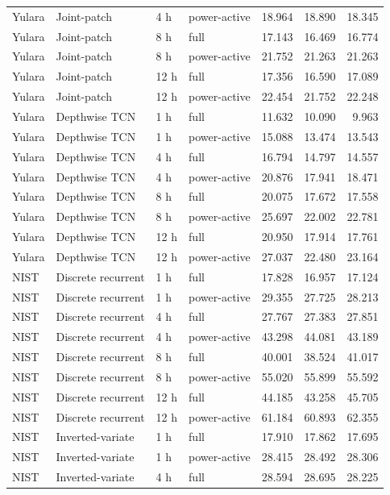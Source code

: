 \begin{longtable}{llllrrr}
Yulara & Joint-patch & 4 h & power-active & 18.964 & 18.890 & 18.345\\
Yulara & Joint-patch & 8 h & full & 17.143 & 16.469 & 16.774\\
Yulara & Joint-patch & 8 h & power-active & 21.752 & 21.263 & 21.263\\
Yulara & Joint-patch & 12 h & full & 17.356 & 16.590 & 17.089\\
Yulara & Joint-patch & 12 h & power-active & 22.454 & 21.752 & 22.248\\
Yulara & Depthwise TCN & 1 h & full & 11.632 & 10.090 & 9.963\\
Yulara & Depthwise TCN & 1 h & power-active & 15.088 & 13.474 & 13.543\\
Yulara & Depthwise TCN & 4 h & full & 16.794 & 14.797 & 14.557\\
Yulara & Depthwise TCN & 4 h & power-active & 20.876 & 17.941 & 18.471\\
Yulara & Depthwise TCN & 8 h & full & 20.075 & 17.672 & 17.558\\
Yulara & Depthwise TCN & 8 h & power-active & 25.697 & 22.002 & 22.781\\
Yulara & Depthwise TCN & 12 h & full & 20.950 & 17.914 & 17.761\\
Yulara & Depthwise TCN & 12 h & power-active & 27.037 & 22.480 & 23.164\\
NIST & Discrete recurrent & 1 h & full & 17.828 & 16.957 & 17.124\\
NIST & Discrete recurrent & 1 h & power-active & 29.355 & 27.725 & 28.213\\
NIST & Discrete recurrent & 4 h & full & 27.767 & 27.383 & 27.851\\
NIST & Discrete recurrent & 4 h & power-active & 43.298 & 44.081 & 43.189\\
NIST & Discrete recurrent & 8 h & full & 40.001 & 38.524 & 41.017\\
NIST & Discrete recurrent & 8 h & power-active & 55.020 & 55.899 & 55.592\\
NIST & Discrete recurrent & 12 h & full & 44.185 & 43.258 & 45.705\\
NIST & Discrete recurrent & 12 h & power-active & 61.184 & 60.893 & 62.355\\
NIST & Inverted-variate & 1 h & full & 17.910 & 17.862 & 17.695\\
NIST & Inverted-variate & 1 h & power-active & 28.415 & 28.492 & 28.306\\
NIST & Inverted-variate & 4 h & full & 28.594 & 28.695 & 28.225\\

\end{longtable}

